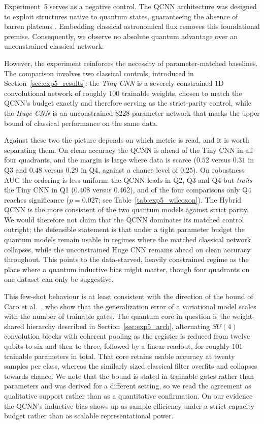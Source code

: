 Experiment~5 serves as a negative control. The QCNN architecture \cite{cong2019qcnn} was designed to exploit structures native to quantum states, guaranteeing the absence of barren plateaus \cite{pesah2021absence}. Embedding classical astronomical flux removes this foundational premise. Consequently, we observe no absolute quantum advantage over an unconstrained classical network.

However, the experiment reinforces the necessity of parameter-matched baselines.
The comparison involves two classical controls, introduced in
Section~\ref{sec:exp5_results}: the \emph{Tiny CNN} is a severely constrained 1D
convolutional network of roughly $100$ trainable weights, chosen to match the
QCNN's budget exactly and therefore serving as the strict-parity control, while
the \emph{Huge CNN} is an unconstrained $8228$-parameter network that marks the
upper bound of classical performance on the same data.

Against these two the picture depends on which metric is read, and it is worth
separating them. On clean accuracy the QCNN is ahead of the Tiny CNN in all four
quadrants, and the margin is large where data is scarce ($0.52$ versus $0.31$ in
Q3 and $0.48$ versus $0.29$ in Q4, against a chance level of $0.25$). On
robustness AUC the ordering is less uniform: the QCNN leads in Q2, Q3 and Q4 but
\emph{trails} the Tiny CNN in Q1 ($0.408$ versus $0.462$), and of the four
comparisons only Q4 reaches significance ($p = 0.027$; see
Table~\ref{tab:exp5_wilcoxon}). The Hybrid QCNN is the more consistent of the two
quantum models against strict parity. We would therefore not claim that the QCNN
dominates its matched control outright; the defensible statement is that under a
tight parameter budget the quantum models remain usable in regimes where the
matched classical network collapses, while the unconstrained Huge CNN remains
ahead on clean accuracy throughout. This points to the data-starved, heavily
constrained regime as the place where a quantum inductive bias might matter,
though four quadrants on one dataset can only be suggestive.

This few-shot behaviour is at least consistent with the direction of the bound of
Caro et al.~\cite{caro2022generalization}, who show that the generalization error
of a variational model scales with the number of trainable gates. The quantum
core in question is the weight-shared hierarchy described in
Section~\ref{sec:exp5_arch}, alternating $SU(4)$ convolution blocks with coherent
pooling as the register is reduced from twelve qubits to six and then to three,
followed by a linear readout, for roughly $101$ trainable parameters in total.
That core retains usable accuracy at twenty samples per class, whereas the
similarly sized classical filter overfits and collapses towards chance. We note
that the bound is stated in trainable gates rather than parameters and was
derived for a different setting, so we read the agreement as qualitative support
rather than as a quantitative confirmation. On our evidence the QCNN's inductive
bias shows up as sample efficiency under a strict capacity budget rather than as
scalable representational power.

